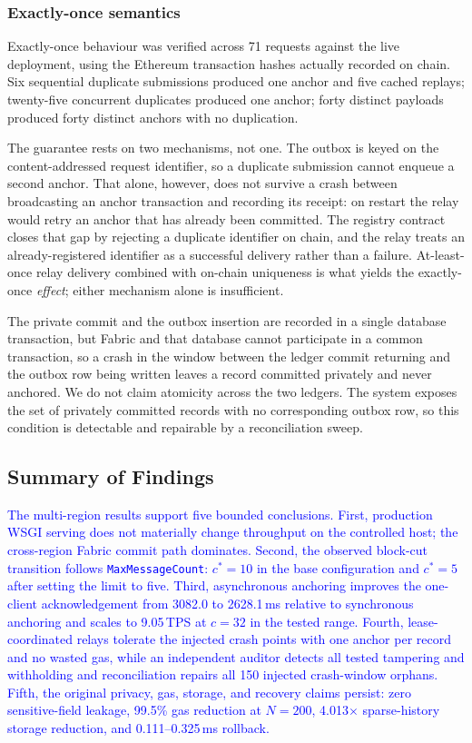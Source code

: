 \documentclass[final,5p,times,twocolumn]{elsarticle}
\begin{document}
\subsubsection*{\textbf{Exactly-once semantics}}
Exactly-once behaviour was verified across 71 requests against the live
deployment, using the Ethereum transaction hashes actually recorded on chain.
Six sequential duplicate submissions produced one anchor and five cached
replays; twenty-five concurrent duplicates produced one anchor; forty distinct
payloads produced forty distinct anchors with no duplication.

The guarantee rests on two mechanisms, not one. The outbox is keyed on the
content-addressed request identifier, so a duplicate submission cannot enqueue a
second anchor. That alone, however, does not survive a crash between broadcasting
an anchor transaction and recording its receipt: on restart the relay would
retry an anchor that has already been committed. The registry contract closes
that gap by rejecting a duplicate identifier on chain, and the relay treats an
already-registered identifier as a successful delivery rather than a failure.
At-least-once relay delivery combined with on-chain uniqueness is what yields
the exactly-once \emph{effect}; either mechanism alone is insufficient.

The private commit and the outbox insertion are recorded in a single database
transaction, but Fabric and that database cannot participate in a common
transaction, so a crash in the window between the ledger commit returning and
the outbox row being written leaves a record committed privately and never
anchored. We do not claim atomicity across the two ledgers. The system exposes
the set of privately committed records with no corresponding outbox row, so this
condition is detectable and repairable by a reconciliation sweep.

\fi
\subsection{\textbf{Summary of Findings}}
\label{sec:res_summary}

\textcolor{blue}{The multi-region results support five bounded conclusions. First, production WSGI serving does not materially change throughput on the controlled host; the cross-region Fabric commit path dominates. Second, the observed block-cut transition follows \texttt{MaxMessageCount}: $c^*=10$ in the base configuration and $c^*=5$ after setting the limit to five. Third, asynchronous anchoring improves the one-client acknowledgement from 3082.0 to 2628.1\,ms relative to synchronous anchoring and scales to 9.05\,TPS at $c=32$ in the tested range. Fourth, lease-coordinated relays tolerate the injected crash points with one anchor per record and no wasted gas, while an independent auditor detects all tested tampering and withholding and reconciliation repairs all 150 injected crash-window orphans. Fifth, the original privacy, gas, storage, and recovery claims persist: zero sensitive-field leakage, 99.5\% gas reduction at $N=200$, 4.013$\times$ sparse-history storage reduction, and 0.111--0.325\,ms rollback.}
\end{document}
